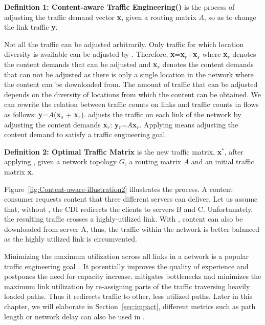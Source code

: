 \noindent \textbf{Definition 1: Content-aware Traffic Engineering(\cate)} is
the process of adjusting the traffic demand vector {\bf x}, given a routing
matrix $A$, so as to change the link traffic {\bf y}.

Not all the traffic can be adjusted arbitrarily. Only traffic for which
location diversity is available can be adjusted by \cate.  Therefore, {\bf
  x}={\bf x$_r$}+{\bf x$_s$} where {\bf x$_r$} denotes the content demands that
can be adjusted and {\bf x$_s$} denotes the content demands that can not be
adjusted as there is only a single location in the network where the content
can be downloaded from.  The amount of traffic that can be adjusted depends on
the diversity of locations from which the content can be obtained.  We can
rewrite the relation between traffic counts on links and traffic counts in
flows as follows: {\bf y}=$A$({\bf x$_s$} $+$ {\bf x$_r$}).  \cate adjusts the
traffic on each link of the network by adjusting the content demands {\bf
  x$_r$}: {\bf y$_r$}=$A${\bf x$_r$}. Applying \cate means adjusting the
content demand to satisfy a traffic engineering goal.


\noindent \textbf{Definition 2: Optimal Traffic Matrix} is the new traffic
matrix, {\bf x}$^*$, after applying \cate, given a network topology $G$, a
routing matrix $A$ and an initial traffic matrix {\bf x}.

Figure~\ref{fig:Content-aware-illustration2} illustrates the \cate process.  A
content consumer requests content that three different servers can deliver. Let
us assume that, without \cate, the CDI redirects the clients to servers B and
C.  Unfortunately, the resulting traffic crosses a highly-utilized link. With
\cate, content can also be downloaded from server A, thus, the traffic within
the network is better balanced as the highly utilized link is circumvented.

Minimizing the maximum utilization across all links in a network is a popular
traffic engineering goal~\cite{FT00,FT01,ImprovingPerformanceInternet2009}.  It
potentially improves the quality of experience and postpones the need for
capacity increase. \cate mitigates bottlenecks and minimizes the maximum link
utilization by re-assigning parts of the traffic traversing heavily loaded
paths. Thus it redirects traffic to other, less utilized paths.  Later in this
chapter, we will elaborate in Section~\ref{sec:impact}, different metrics such
as path length or network delay can also be used in \cate.


